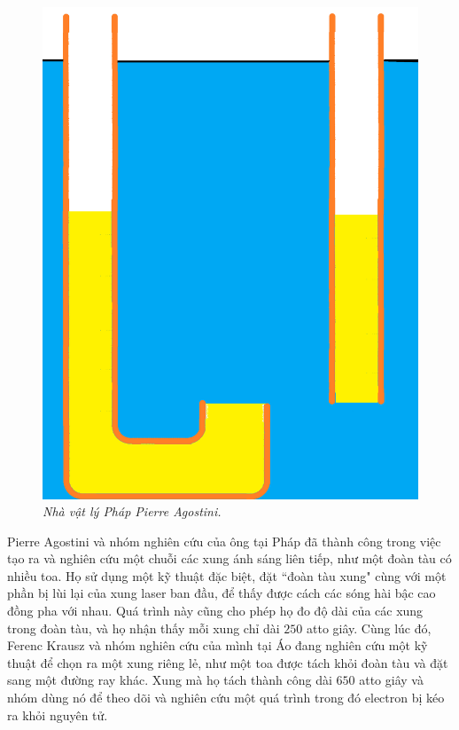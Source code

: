 \begin{multicols}{2}
	\begin{figure}[H]
		\vspace*{-5pt}
		\centering
		\captionsetup{labelformat= empty, justification=centering}
		\includegraphics[width= 1\linewidth]{10}
		\caption{\small\textit{\color{timhieukhoahoc}Nhà vật lý Pháp  Pierre Agostini.}}
		\vspace*{-10pt}
	\end{figure}
	Pierre Agostini và nhóm nghiên cứu của ông tại Pháp đã thành công trong việc tạo ra và nghiên cứu một chuỗi các xung ánh sáng liên tiếp, như một đoàn tàu có nhiều toa. Họ sử dụng một kỹ thuật đặc biệt, đặt ``đoàn tàu xung" cùng với một phần bị lùi lại của xung laser ban đầu, để thấy được cách các sóng hài bậc cao đồng pha với nhau. Quá trình này cũng cho phép họ đo độ dài của các xung trong đoàn tàu, và họ nhận thấy mỗi xung chỉ dài $250$ atto giây.
	\vskip 0.1cm
	Cùng lúc đó, Ferenc Krausz và nhóm nghiên cứu của mình tại Áo đang nghiên cứu một kỹ thuật để chọn ra một xung riêng lẻ, như một toa được tách khỏi đoàn tàu và đặt sang một đường ray khác. Xung mà họ tách thành công dài $650$ atto giây và nhóm dùng nó để theo dõi và nghiên cứu một quá trình trong đó electron bị kéo ra khỏi nguyên tử.

\end{multicols}
